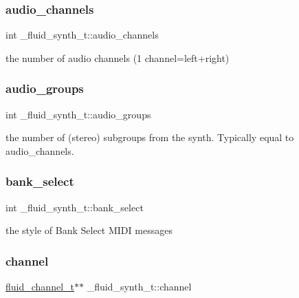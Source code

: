 \subsubsection{\texorpdfstring{audio\+\_\+channels}{audio\_channels}}
{\footnotesize\ttfamily int \+\_\+fluid\+\_\+synth\+\_\+t\+::audio\+\_\+channels}

the number of audio channels (1 channel=left+right) \mbox{\label{struct__fluid__synth__t_a476122fb39bbdd36e3ad6387439b2f56}} 
\subsubsection{\texorpdfstring{audio\+\_\+groups}{audio\_groups}}
{\footnotesize\ttfamily int \+\_\+fluid\+\_\+synth\+\_\+t\+::audio\+\_\+groups}

the number of (stereo) \textquotesingle{}sub\textquotesingle{}groups from the synth. Typically equal to audio\+\_\+channels. \mbox{\label{struct__fluid__synth__t_a3b97457936d5897010cbec75efa9a4be}} 
\subsubsection{\texorpdfstring{bank\+\_\+select}{bank\_select}}
{\footnotesize\ttfamily int \+\_\+fluid\+\_\+synth\+\_\+t\+::bank\+\_\+select}

the style of Bank Select M\+I\+DI messages \mbox{\label{struct__fluid__synth__t_a6914014a341347e9ba46a2ea21d9cd26}} 
\subsubsection{\texorpdfstring{channel}{channel}}
{\footnotesize\ttfamily \hyperlink{fluidsynth__priv_8h_a9e766203efa8135ece6f462e9caa1b12}{fluid\+\_\+channel\+\_\+t}$\ast$$\ast$ \+\_\+fluid\+\_\+synth\+\_\+t\+::channel}

